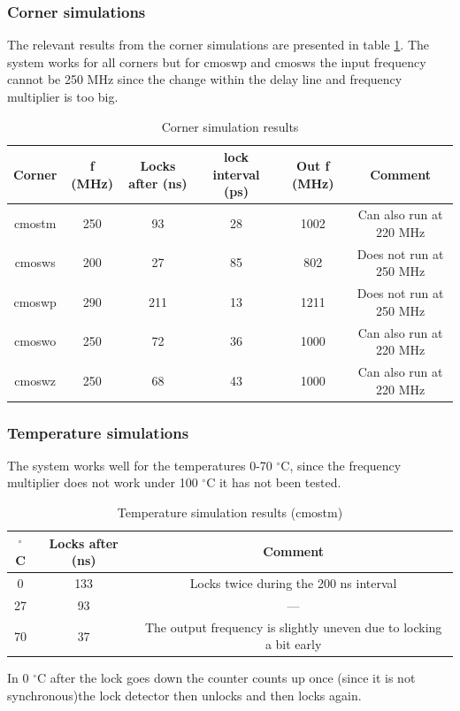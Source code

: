 \documentclass[a4paper,12pt]{article} \usepackage{graphicx}
\newcommand{\degree}{\ensuremath{^\circ}}
\begin{document}
\subsubsection{Corner simulations}
The relevant results from the corner simulations are presented in
table \ref{tab:WS_corner}. The system works for all corners but
for cmoswp and cmosws the input frequency cannot be 250 MHz since the
change within the delay line and frequency multiplier is too big. 
\begin{table}[h]
        \centering
        \begin{tabular}{|c|c|c|c|c|c|}
                \hline
                \textbf{Corner} & \textbf{f (MHz)} &
                \textbf{Locks after (ns)} & \textbf{lock interval (ps)} & \textbf{Out f
                  (MHz)} & \textbf{Comment} \\
                \hline
                cmostm & 250 & 93  & 28 & 1002 & Can also run at 220 MHz \\
                cmosws & 200 & 27  & 85 & 802  & Does not run at 250 MHz \\
                cmoswp & 290 & 211 & 13 & 1211 & Does not run at 250 MHz \\
                cmoswo & 250 & 72  & 36 & 1000 & Can also run at 220 MHz \\
                cmoswz & 250 & 68  & 43 & 1000 & Can also run at 220 MHz \\
                \hline
        \end{tabular}
        \caption{Corner simulation results}
        \label{tab:WS_corner}
\end{table}
\subsubsection{Temperature simulations}
The system works well for the temperatures 0-70 \degree C, since the
frequency multiplier does not work under 100 \degree C it has not been
tested.
  
\begin{table}[h]
        \centering
        \begin{tabular}{|c|c|c|}
          \hline
          \textbf{\degree C} & \textbf{Locks after (ns)} & \textbf{Comment} \\
          \hline
          0  & 133 & Locks twice during the 200 ns interval \\
          27 & 93  & --- \\
          70 & 37  & The output frequency is slightly uneven due to
          locking a bit early \\
          \hline
        \end{tabular}
        \caption{Temperature simulation results (cmostm)}
        \label{tab:WS_temp}
      \end{table}
In 0 \degree C after the lock goes down the counter counts up once
(since it is not synchronous)the lock detector then unlocks and then
locks again.  
\end{document}
